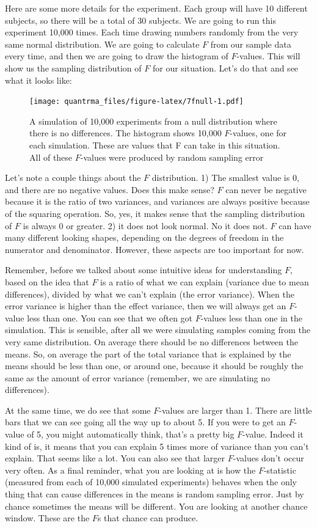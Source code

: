 \documentclass[
]{book}
\begin{document}
Here are some more details for the experiment. Each group will have 10 different subjects, so there will be a total of 30 subjects. We are going to run this experiment 10,000 times. Each time drawing numbers randomly from the very same normal distribution. We are going to calculate \(F\) from our sample data every time, and then we are going to draw the histogram of \(F\)-values. This will show us the sampling distribution of \(F\) for our situation. Let's do that and see what it looks like:

\begin{figure}
\centering
\texttt{[image: quantrma\_files/figure-latex/7fnull-1.pdf]}
\caption{\label{fig:7fnull}A simulation of 10,000 experiments from a null distribution where there is no differences. The histogram shows 10,000 \(F\)-values, one for each simulation. These are values that F can take in this situation. All of these \(F\)-values were produced by random sampling error}
\end{figure}

Let's note a couple things about the \(F\) distribution. 1) The smallest value is 0, and there are no negative values. Does this make sense? \(F\) can never be negative because it is the ratio of two variances, and variances are always positive because of the squaring operation. So, yes, it makes sense that the sampling distribution of \(F\) is always 0 or greater. 2) it does not look normal. No it does not. \(F\) can have many different looking shapes, depending on the degrees of freedom in the numerator and denominator. However, these aspects are too important for now.

Remember, before we talked about some intuitive ideas for understanding \(F\), based on the idea that \(F\) is a ratio of what we can explain (variance due to mean differences), divided by what we can't explain (the error variance). When the error variance is higher than the effect variance, then we will always get an \(F\)-value less than one. You can see that we often got \(F\)-values less than one in the simulation. This is sensible, after all we were simulating samples coming from the very same distribution. On average there should be no differences between the means. So, on average the part of the total variance that is explained by the means should be less than one, or around one, because it should be roughly the same as the amount of error variance (remember, we are simulating no differences).

At the same time, we do see that some \(F\)-values are larger than 1. There are little bars that we can see going all the way up to about 5. If you were to get an \(F\)-value of 5, you might automatically think, that's a pretty big \(F\)-value. Indeed it kind of is, it means that you can explain 5 times more of variance than you can't explain. That seems like a lot. You can also see that larger \(F\)-values don't occur very often. As a final reminder, what you are looking at is how the \(F\)-statistic (measured from each of 10,000 simulated experiments) behaves when the only thing that can cause differences in the means is random sampling error. Just by chance sometimes the means will be different. You are looking at another chance window. These are the \(F\)s that chance can produce.
\end{document}
